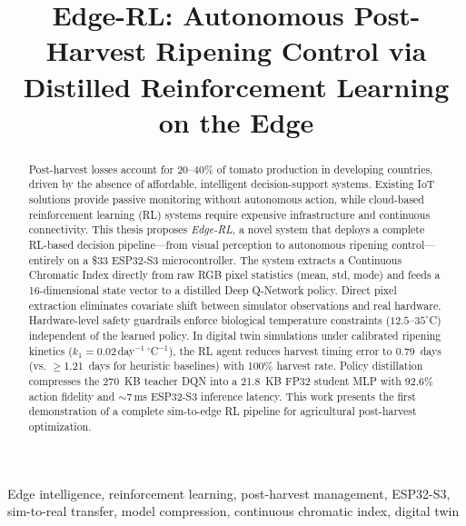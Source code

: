 \documentclass[conference]{IEEEtran}
\begin{document}
\title{Edge-RL: Autonomous Post-Harvest Ripening Control via Distilled Reinforcement Learning on the Edge}

\author{
\and
{}
}

\maketitle

\begin{abstract}
Post-harvest losses account for 20--40\% of tomato production in developing countries, driven by the absence of affordable, intelligent decision-support systems. Existing IoT solutions provide passive monitoring without autonomous action, while cloud-based reinforcement learning (RL) systems require expensive infrastructure and continuous connectivity. This thesis proposes \textit{Edge-RL}, a novel system that deploys a complete RL-based decision pipeline---from visual perception to autonomous ripening control---entirely on a \$33 ESP32-S3 microcontroller. The system extracts a Continuous Chromatic Index directly from raw RGB pixel statistics (mean, std, mode) and feeds a 16-dimensional state vector to a distilled Deep Q-Network policy. Direct pixel extraction eliminates covariate shift between simulator observations and real hardware. Hardware-level safety guardrails enforce biological temperature constraints ($12.5$--$35^{\circ}$C) independent of the learned policy. In digital twin simulations under calibrated ripening kinetics ($k_1=0.02$\,day$^{-1}\,^\circ$C$^{-1}$), the RL agent reduces harvest timing error to 0.79~days (vs. $\geq$1.21~days for heuristic baselines) with 100\% harvest rate. Policy distillation compresses the 270~KB teacher DQN into a 21.8~KB FP32 student MLP with 92.6\% action fidelity and $\sim$7\,ms ESP32-S3 inference latency. This work presents the first demonstration of a complete sim-to-edge RL pipeline for agricultural post-harvest optimization.
\end{abstract}

\begin{IEEEkeywords}
Edge intelligence, reinforcement learning, post-harvest management, ESP32-S3, sim-to-real transfer, model compression, continuous chromatic index, digital twin
\end{IEEEkeywords}
\end{document}
